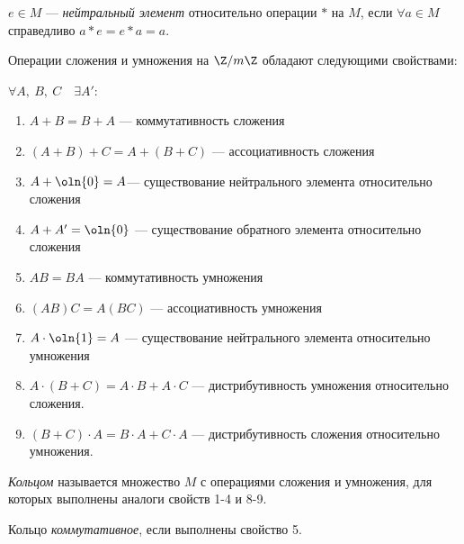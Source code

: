\begin{defn}
    $e \in M$ --- \emph{нейтральный элемент} относительно операции $*$ на $M$, если $\forall a \in M$ справедливо $a * e = e * a = a$.
\end{defn}

\begin{theorem-non}
    Операции сложения и умножения на $\Z/m\Z$ обладают следующими свойствами:
\end{theorem-non}

$\forall A,~B,~C \quad \exists A'$:
\begin{enumerate}
    \item $A + B = B + A$ --- коммутативность сложения
    
    \item $(A + B) + C = A + (B + C)$ --- ассоциативность сложения
    
    \item $A + \oln{0} = A$--- существование нейтрального элемента относительно сложения
    
    \item $A + A' = \oln{0}$ --- существование обратного элемента относительно сложения
    
    \item $AB = BA$ --- коммутативность умножения
    
    \item $(AB)C = A(BC)$ --- ассоциативность умножения
    
    \item $A \cdot \oln{1} = A$ --- существование нейтрального элемента относительно умножения
    
    \item $A \cdot (B + C) = A \cdot B + A \cdot C$ --- дистрибутивность умножения относительно сложения.
    
    \item $(B + C) \cdot A = B \cdot A + C \cdot A$ --- дистрибутивность сложения относительно умножения.
\end{enumerate}

\begin{defn}
    \emph{Кольцом} называется множество $M$ с операциями сложения и умножения, для которых выполнены аналоги свойств 1-4 и 8-9.
\end{defn}

\begin{defn}
    Кольцо \emph{коммутативное}, если выполнены свойство 5.
\end{defn}

